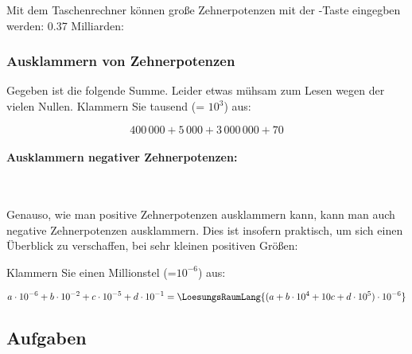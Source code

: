 Mit dem Taschenrechner können große Zehnerpotenzen mit der
  -Taste eingegben
  werden: 0.37 Milliarden:



\newpage


\subsubsection{Ausklammern von Zehnerpotenzen}
Gegeben ist die folgende Summe. Leider etwas mühsam zum Lesen wegen der vielen Nullen. Klammern Sie tausend (= $10^3$) aus:

$$400\,000 + 5\,000 + 3\,000\,000 + 70$$


\paragraph{Ausklammern negativer Zehnerpotenzen:}
\,

\vspace{1mm}

Genauso, wie man positive Zehnerpotenzen ausklammern kann, kann man auch negative Zehnerpotenzen ausklammern. Dies ist insofern praktisch, um sich einen Überblick zu verschaffen, bei sehr kleinen positiven Größen:

Klammern Sie einen Millionstel (=$10^{-6}$) aus:


$$a\cdot{}10^{-6} + b\cdot{}10^{-2} + c\cdot{}10^{-5} +
d\cdot{}10^{-1} = \LoesungsRaumLang{(a + b\cdot{}10^4 + 10c + d\cdot{}10^{5}) \cdot{} 10^{-6}}$$

\subsection*{Aufgaben}





\newpage
